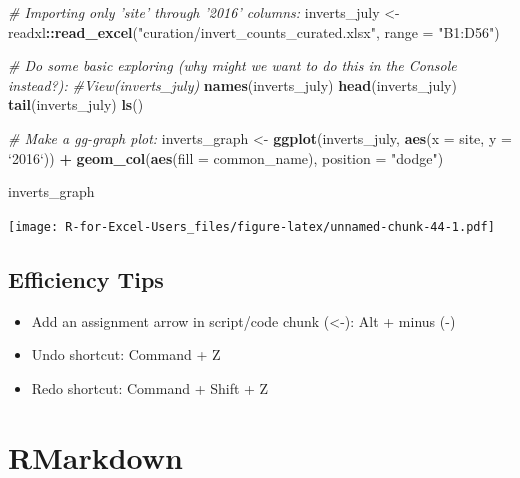 \documentclass[]{book}
\newenvironment{Shaded}{\begin{snugshade}}{\end{snugshade}}
\newcommand{\CommentTok}[1]{\textcolor[rgb]{0.56,0.35,0.01}{\textit{#1}}}
\newcommand{\DataTypeTok}[1]{\textcolor[rgb]{0.13,0.29,0.53}{#1}}
\newcommand{\KeywordTok}[1]{\textcolor[rgb]{0.13,0.29,0.53}{\textbf{#1}}}
\newcommand{\NormalTok}[1]{#1}
\newcommand{\OperatorTok}[1]{\textcolor[rgb]{0.81,0.36,0.00}{\textbf{#1}}}
\newcommand{\StringTok}[1]{\textcolor[rgb]{0.31,0.60,0.02}{#1}}
\providecommand{\tightlist}{%
  \setlength{\itemsep}{0pt}\setlength{\parskip}{0pt}}
\begin{document}
\begin{Shaded}
\begin{Highlighting}[]
\CommentTok{# Importing only 'site' through '2016' columns: }
\NormalTok{inverts_july <-}\StringTok{ }\NormalTok{readxl}\OperatorTok{::}\KeywordTok{read_excel}\NormalTok{(}\StringTok{"curation/invert_counts_curated.xlsx"}\NormalTok{, }\DataTypeTok{range =} \StringTok{"B1:D56"}\NormalTok{)}

\CommentTok{# Do some basic exploring (why might we want to do this in the Console instead?):}
\CommentTok{#View(inverts_july)}
\KeywordTok{names}\NormalTok{(inverts_july)}
\KeywordTok{head}\NormalTok{(inverts_july)}
\KeywordTok{tail}\NormalTok{(inverts_july)}
\KeywordTok{ls}\NormalTok{()}

\CommentTok{# Make a gg-graph plot: }
\NormalTok{inverts_graph <-}\StringTok{ }\KeywordTok{ggplot}\NormalTok{(inverts_july, }\KeywordTok{aes}\NormalTok{(}\DataTypeTok{x =}\NormalTok{ site, }\DataTypeTok{y =} \StringTok{`}\DataTypeTok{2016}\StringTok{`}\NormalTok{)) }\OperatorTok{+}
\StringTok{  }\KeywordTok{geom_col}\NormalTok{(}\KeywordTok{aes}\NormalTok{(}\DataTypeTok{fill =}\NormalTok{ common_name), }
           \DataTypeTok{position =} \StringTok{"dodge"}\NormalTok{)}
\end{Highlighting}
\end{Shaded}

\begin{Shaded}
\begin{Highlighting}[]
\NormalTok{inverts_graph}
\end{Highlighting}
\end{Shaded}

\texttt{[image: R-for-Excel-Users\_files/figure-latex/unnamed-chunk-44-1.pdf]}

\hypertarget{efficiency-tips-1}{%
\section{Efficiency Tips}\label{efficiency-tips-1}}

\begin{itemize}
\tightlist
\item
  Add an assignment arrow in script/code chunk (\textless{}-): Alt + minus (-)
\item
  Undo shortcut: Command + Z
\item
  Redo shortcut: Command + Shift + Z
\end{itemize}

\hypertarget{rmarkdown}{%
\chapter{RMarkdown}\label{rmarkdown}}
\end{document}
